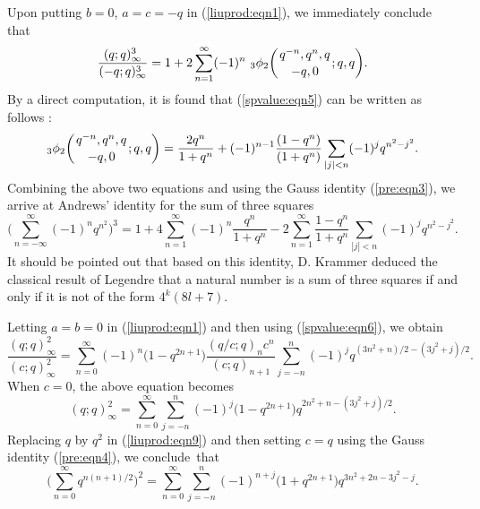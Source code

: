 \documentclass[pdftex]{sigma}
\numberwithin{equation}{section}
\begin{document}
Upon putting $b=0$, $a=c=-q$ in (\ref{liuprod:eqn1}), we immediately conclude that
\begin{equation*}	%
\frac{(q; q)_\infty^3}{(-q; q)_\infty^3}
=1+2\sum_{n=1}^\infty (-1)^n ~ {_3 \phi_2} \biggl({{q^{-n}, q^n, q}
	\atop{ -q, 0}}; q, q\biggr).
\end{equation*}
By a direct computation, it is found that (\ref{spvalue:eqn5}) can be written as follows \cite[equation~(3.10)]{Liu2013IJTN}:
\begin{equation*}%
	{_3\phi_2} \biggl({{q^{-n}, q^n, q}\atop{-q, 0}}; q, q\biggr)	
	=\frac{2q^n}{1+q^n}+(-1)^{n-1} \frac{(1-q^n)}{(1+q^n)}
	\sum_{|j|<n} (-1)^{j} q^{n^2-j^2}.
\end{equation*}
Combining the above two equations and using the Gauss identity (\ref{pre:eqn3}), we arrive at Andrews' identity for the sum of three squares \cite[equation~(5.16)]{Andrews86}
\begin{equation*}%
	\Biggl(\sum_{n=-\infty}^\infty (-1)^n q^{n^2}\Biggr)^{3}
	=1+4\sum_{n=1}^\infty (-1)^n \frac{q^n}{1+q^n}
	-2\sum_{n=1}^\infty \frac{1-q^n}{1+q^n} \sum_{|j|<n}(-1)^j q^{n^2-j^2}.
\end{equation*}
It should be pointed out that based on this identity, D. Krammer \cite{Krammer1993} deduced the classical result of Legendre that a natural number is a sum of three squares if and only if it is not of the form $4^k (8l+7)$.

Letting $a=b=0$ in (\ref{liuprod:eqn1}) and then using (\ref{spvalue:eqn6}), we obtain
\begin{equation}\label{liuprod:eqn9}
\frac{(q; q)^2_\infty}{(c; q)^2_\infty}
=\sum_{n=0}^\infty (-1)^n \bigl(1-q^{2n+1}\bigr) \frac{(q/c; q)_n c^n}{(c; q)_{n+1}} \sum_{j=-n}^n (-1)^j q^{(3n^2+n)/2-(3j^2+j)/2}.
\end{equation}
When $c=0$, the above equation becomes \cite[equation~(1.2)]{Liu2002}
\begin{equation*} %
(q; q)_\infty^2=\sum_{n=0}^\infty \sum_{j=-n}^n (-1)^j \bigl(1-q^{2n+1}\bigr) q^{2n^2+n-(3j^2+j)/2}.
\end{equation*}
Replacing $q$ by $q^2$ in (\ref{liuprod:eqn9}) and then setting $c=q$ using the Gauss identity (\ref{pre:eqn4}), we conclude~that%
\begin{equation*}%
\Biggl(\sum_{n=0}^\infty q^{n(n+1)/2}\Biggr)^2
=\sum_{n=0}^\infty \sum_{j=-n}^n (-1)^{n+j} \bigl(1+q^{2n+1}\bigr) q^{3n^2+2n-3j^2-j}.
\end{equation*}
\end{document}
